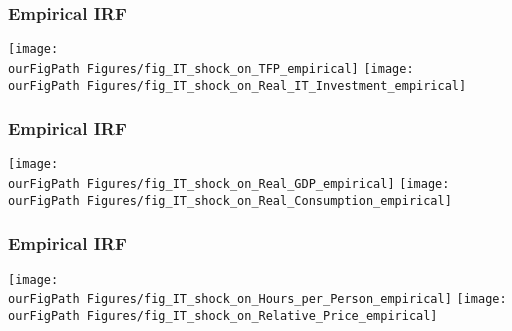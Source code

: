 \documentclass{beamer}
\def \ourFigPath {../../}
\begin{document}
\begin{frame}
\frametitle{Empirical IRF}

\begin{center}
	\texttt{[image: \\ourFigPath Figures/fig\_IT\_shock\_on\_TFP\_empirical]}
		\texttt{[image: \\ourFigPath Figures/fig\_IT\_shock\_on\_Real\_IT\_Investment\_empirical]}
\end{center}


\end{frame}


\begin{frame}
\frametitle{Empirical IRF}

\begin{center}
	\texttt{[image: \\ourFigPath Figures/fig\_IT\_shock\_on\_Real\_GDP\_empirical]}
	\texttt{[image: \\ourFigPath Figures/fig\_IT\_shock\_on\_Real\_Consumption\_empirical]}
\end{center}



\end{frame}


\begin{frame}
\frametitle{Empirical IRF}

\begin{center}
	\texttt{[image: \\ourFigPath Figures/fig\_IT\_shock\_on\_Hours\_per\_Person\_empirical]}
	\texttt{[image: \\ourFigPath Figures/fig\_IT\_shock\_on\_Relative\_Price\_empirical]}
\end{center}

\end{frame}
\end{document}
